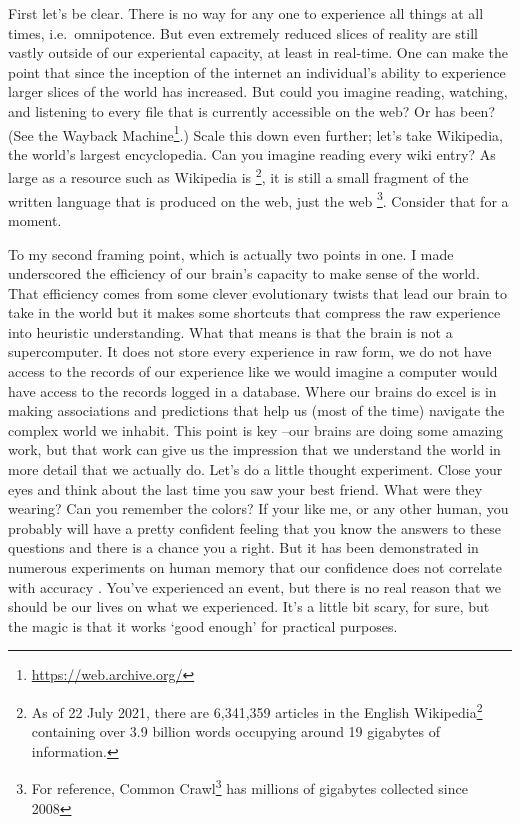 \documentclass[
]{article}
\DeclareRobustCommand{\href}[2]{#2\footnote{\url{#1}}}
\begin{document}
First let's be clear. There is no way for any one to experience all things at all times, i.e.~omnipotence. But even extremely reduced slices of reality are still vastly outside of our experiental capacity, at least in real-time. One can make the point that since the inception of the internet an individual's ability to experience larger slices of the world has increased. But could you imagine reading, watching, and listening to every file that is currently accessible on the web? Or has been? (See the \href{https://web.archive.org/}{Wayback Machine}.) Scale this down even further; let's take Wikipedia, the world's largest encyclopedia. Can you imagine reading every wiki entry? As large as a resource such as Wikipedia is \footnote{As of 22 July 2021, there are 6,341,359 articles in the \href{https://en.wikipedia.org/wiki/English_Wikipedia}{English Wikipedia} containing over 3.9 billion words occupying around 19 gigabytes of information.}, it is still a small fragment of the written language that is produced on the web, just the web \footnote{For reference, \href{https://commoncrawl.org/big-picture/}{Common Crawl} has millions of gigabytes collected since 2008}. Consider that for a moment.

To my second framing point, which is actually two points in one. I made underscored the efficiency of our brain's capacity to make sense of the world. That efficiency comes from some clever evolutionary twists that lead our brain to take in the world but it makes some shortcuts that compress the raw experience into heuristic understanding. What that means is that the brain is not a supercomputer. It does not store every experience in raw form, we do not have access to the records of our experience like we would imagine a computer would have access to the records logged in a database. Where our brains do excel is in making associations and predictions that help us (most of the time) navigate the complex world we inhabit. This point is key --our brains are doing some amazing work, but that work can give us the impression that we understand the world in more detail that we actually do. Let's do a little thought experiment. Close your eyes and think about the last time you saw your best friend. What were they wearing? Can you remember the colors? If your like me, or any other human, you probably will have a pretty confident feeling that you know the answers to these questions and there is a chance you a right. But it has been demonstrated in numerous experiments on human memory that our confidence does not correlate with accuracy \citep{Talarico2003, roediger:2000}. You've experienced an event, but there is no real reason that we should be our lives on what we experienced. It's a little bit scary, for sure, but the magic is that it works `good enough' for practical purposes.
\end{document}

